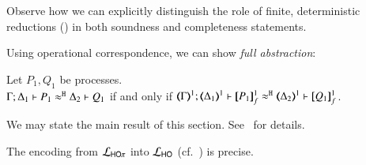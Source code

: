 \documentclass[runningheads]{llncs}
\begin{document}
{\begin{proposition}
\begin{enumerate}[1.]
\begin{enumerate}[a)]
			\end{enumerate}
		    
	\end{enumerate}
\end{proposition}

\noi Observe how we can explicitly distinguish the role of finite, deterministic reductions 
() in both soundness and completeness statements.

Using operational correspondence, we can show \emph{full abstraction}:
\begin{proposition}%
	\label{prop:fulla_HOp_to_HO}
	Let $P_1, Q_1$ be \HOp processes. \\
	$\Gamma; \Delta_1 \vdash P_1 \approx^\mathtt{H} \Delta_2 \vdash Q_1$
	if and only if
	$\horel{\tmap{\Gamma}{1}}{\tmap{\Delta_1}{1}}{\pmapp{P_1}{1}{f}}{\hwb}{\tmap{\Delta_2}{1}}{\pmapp{Q_1}{1}{f}}$.
\end{proposition}




We may state the main result of this section. See~\cite{KouzapasPY15} for details. 

\begin{theorem}
\label{f:enc:hopitoho}
The encoding from $\mathcal{L}_{\mathsf{HO}\pi}$ into $\mathcal{L}_{\mathsf{HO}}$ (cf.~)
is precise. 
\end{theorem}


}
\end{document}
